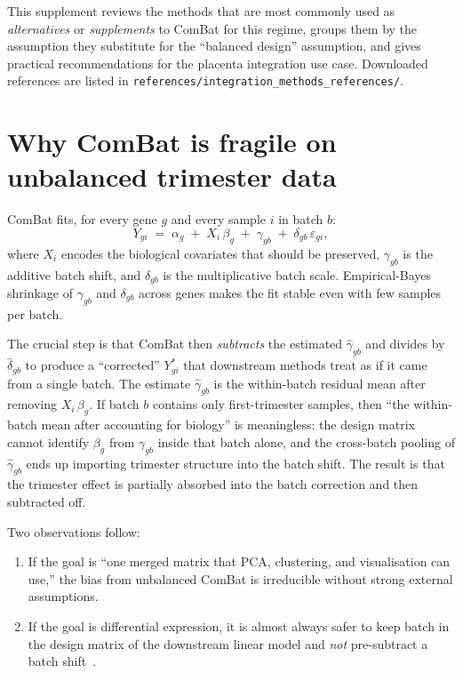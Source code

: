 \documentclass[11pt,a4paper]{article}
\begin{document}
This supplement reviews the methods that are most commonly used as
\emph{alternatives} or \emph{supplements} to ComBat for this regime,
groups them by the assumption they substitute for the
``balanced design'' assumption, and gives practical recommendations
for the placenta integration use case. Downloaded references are
listed in
\texttt{references/integration\_methods\_references/}.

\section{Why ComBat is fragile on unbalanced trimester data}

ComBat fits, for every gene $g$ and every sample $i$ in batch $b$:
\begin{equation}
  Y_{gi} \;=\; \alpha_g \;+\; X_i\,\beta_g \;+\; \gamma_{gb} \;+\;
  \delta_{gb}\,\varepsilon_{gi},
  \label{eq:combat}
\end{equation}
where $X_i$ encodes the biological covariates that should be
preserved, $\gamma_{gb}$ is the additive batch shift, and
$\delta_{gb}$ is the multiplicative batch scale. Empirical-Bayes
shrinkage of $\gamma_{gb}$ and $\delta_{gb}$ across genes makes the
fit stable even with few samples per batch.

The crucial step is that ComBat then \emph{subtracts} the estimated
$\hat{\gamma}_{gb}$ and divides by $\hat{\delta}_{gb}$ to produce a
``corrected'' $Y^{*}_{gi}$ that downstream methods treat as if it
came from a single batch. The estimate $\hat{\gamma}_{gb}$ is the
within-batch residual mean after removing $X_i\,\beta_g$. If batch
$b$ contains only first-trimester samples, then ``the within-batch
mean after accounting for biology'' is meaningless: the design matrix
cannot identify $\beta_g$ from $\gamma_{gb}$ inside that batch alone,
and the cross-batch pooling of $\hat{\gamma}_{gb}$ ends up importing
trimester structure into the batch shift. The result is that the
trimester effect is partially absorbed into the batch correction and
then subtracted off.

Two observations follow:
\begin{enumerate}
  \item If the goal is ``one merged matrix that PCA, clustering, and
        visualisation can use,'' the bias from unbalanced ComBat is
        irreducible without strong external assumptions.
  \item If the goal is differential expression, it is almost always
        safer to keep batch in the design matrix of the
        downstream linear model and \emph{not} pre-subtract a batch
        shift~\cite{nygaard2016,towfic2017}.
\end{enumerate}
\end{document}
